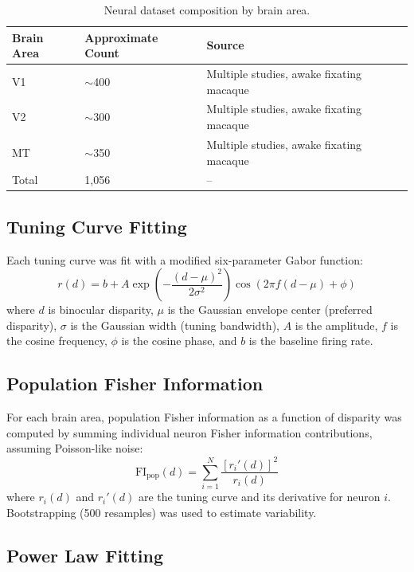 \documentclass[12pt]{article}
\begin{document}
\begin{table}[ht]
\centering
\caption{Neural dataset composition by brain area.}
\label{tab:neurons}
\begin{tabular}{lll}
\toprule
Brain Area & Approximate Count & Source \\
\midrule
V1 & $\sim$400 & Multiple studies, awake fixating macaque \\
V2 & $\sim$300 & Multiple studies, awake fixating macaque \\
MT & $\sim$350 & Multiple studies, awake fixating macaque \\
Total & 1,056 & -- \\
\bottomrule
\end{tabular}
\end{table}

\subsection{Tuning Curve Fitting}

Each tuning curve was fit with a modified six-parameter Gabor function:
\begin{equation}
r(d) = b + A \exp\left(-\frac{(d - \mu)^{2}}{2\sigma^{2}}\right) \cos(2\pi f (d - \mu) + \phi)
\end{equation}
where $d$ is binocular disparity, $\mu$ is the Gaussian envelope center (preferred disparity), $\sigma$ is the Gaussian width (tuning bandwidth), $A$ is the amplitude, $f$ is the cosine frequency, $\phi$ is the cosine phase, and $b$ is the baseline firing rate.

\subsection{Population Fisher Information}

For each brain area, population Fisher information as a function of disparity was computed by summing individual neuron Fisher information contributions, assuming Poisson-like noise:
\begin{equation}
\text{FI}_{\text{pop}}(d) = \sum_{i=1}^{N} \frac{[r_i'(d)]^{2}}{r_i(d)}
\end{equation}
where $r_i(d)$ and $r_i'(d)$ are the tuning curve and its derivative for neuron $i$. Bootstrapping (500 resamples) was used to estimate variability.

\subsection{Power Law Fitting}
\end{document}
